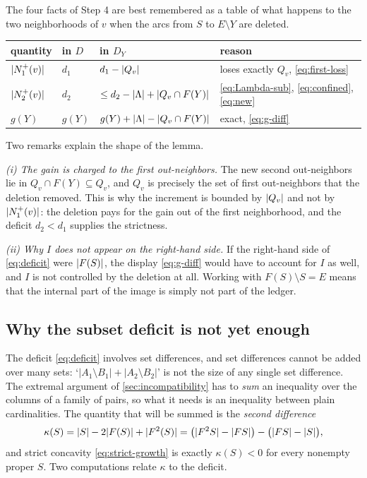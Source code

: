 \begin{remark}\label{rem:ledger}
The four facts of Step 4 are best remembered as a table of what happens to the two neighborhoods of
$v$ when the arcs from $S$ to $E\setminus Y$ are deleted.

\begin{center}
\small
\renewcommand{\arraystretch}{1.25}
\begin{tabular}{@{}llll@{}}
\toprule
quantity & in $D$ & in $D_Y$ & reason \\
\midrule
$\lvert N_1^+(v)\rvert$ & $d_1$ & $d_1-\lvert Q_v\rvert$ & loses exactly $Q_v$, \eqref{eq:first-loss}\\
$\lvert N_2^+(v)\rvert$ & $d_2$ & $\le d_2-\lvert \Lambda\rvert+\lvert Q_v\cap F(Y)\rvert$ & \eqref{eq:Lambda-sub}, \eqref{eq:confined}, \eqref{eq:new}\\
$g(Y)$ & $g(Y)$ & $g(Y)+\lvert \Lambda\rvert-\lvert Q_v\cap F(Y)\rvert$ & exact, \eqref{eq:g-diff}\\
\bottomrule
\end{tabular}
\end{center}

Two remarks explain the shape of the lemma.

\emph{(i) The gain is charged to the first out-neighbors.} The new second out-neighbors lie in
$Q_v\cap F(Y)\subseteq Q_v$, and $Q_v$ is precisely the set of first out-neighbors that the
deletion removed. This is why the increment is bounded by $\lvert Q_v\rvert$ and not by $\lvert N_1^+(v)\rvert$:
the deletion pays for the gain out of the first neighborhood, and the deficit $d_2<d_1$ supplies the
strictness.

\emph{(ii) Why $I$ does not appear on the right-hand side.} If the right-hand side of
\eqref{eq:deficit} were $\lvert F(S)\rvert$, the display \eqref{eq:g-diff} would have to account for
$I$ as well, and $I$ is not controlled by the deletion at all. Working with
$F(S)\setminus S=E$ means that the internal part of the image is simply not part of the ledger.
\end{remark}

\subsection{Why the subset deficit is not yet enough}\label{sec:why-blowup}

The deficit \eqref{eq:deficit} involves set differences, and set differences cannot be added over
many sets: `$|A_1\setminus B_1|+|A_2\setminus B_2|$' is not the size of any single set difference.
The extremal argument of \cref{sec:incompatibility} has to \emph{sum} an inequality over the columns
of a family of pairs, so what it needs is an inequality between plain cardinalities. The quantity
that will be summed is the \emph{second difference}
\begin{equation}\label{eq:kappa}
 \kappa(S)=\lvert S\rvert-2\lvert F(S)\rvert+\lvert F^2(S)\rvert
 =\bigl(\lvert F^2S\rvert-\lvert FS\rvert\bigr)-\bigl(\lvert FS\rvert-\lvert S\rvert\bigr),
\end{equation}
and strict concavity \eqref{eq:strict-growth} is exactly $\kappa(S)<0$ for every nonempty proper
$S$. Two computations relate $\kappa$ to the deficit.

